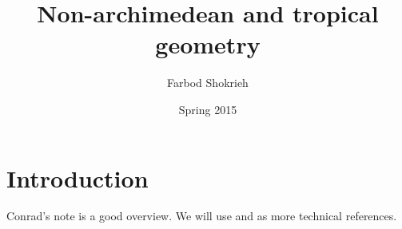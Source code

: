 \documentclass[oneside]{article}
\title{Non-archimedean and tropical geometry}
\author{Farbod Shokrieh}
\date{Spring 2015}
\begin{document}
\maketitle
\tableofcontents





\section{Introduction}

Conrad's note \cite{conrad-2008} is a good overview. We will use 
\cite{berkovich-1990} and \cite{bosch-2014} as more technical references. 







\end{document}
